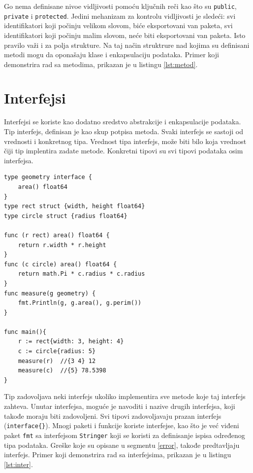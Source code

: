 \documentclass[12pt,oneside]{memoir}
\begin{document}
Go nema definisane nivoe vidljivosti  pomoću ključnih reči kao što su \texttt{public}, \texttt{private} i \texttt{protected}. Jedini mehanizam za kontrolu vidljivosti je sledeći: svi identifikatori koji počinju velikom slovom, biće eksportovani van paketa, svi identifikatori koji počinju malim slovom, neće biti eksportovani van paketa\cite{bookGoProg}. Isto pravilo važi i za polja strukture. Na taj način struktrure nad kojima su definisani metodi mogu da oponašaju klase i enkapsulaciju podataka. Primer koji demonstrira rad sa metodima, prikazan je u listingu \ref{lst:metod}.

\section{Interfejsi}

Interfejsi se koriste kao dodatno sredstvo abstrakcije i enkapsulacije podataka. Tip interfejs, definisan je kao skup potpisa metoda. Svaki interfejs se sastoji od vrednosti i konkretnog tipa. Vrednost tipa interfejs, može biti bilo koja vrednost čiji tip implentira zadate metode. Konkretni tipovi su svi tipovi podataka osim interfejsa.

\begin{center}
\begin{lstlisting}[caption=Primer koji demonstrira rad sa interfejsima, label={lst:inter},  backgroundcolor=\color{background}]
type geometry interface { 
	area() float64 
}
type rect struct {width, height float64}
type circle struct {radius float64}

func (r rect) area() float64 {
	return r.width * r.height
}
func (c circle) area() float64 {
	return math.Pi * c.radius * c.radius
}
func measure(g geometry) {
	fmt.Println(g, g.area(), g.perim())
}

func main(){
	r := rect{width: 3, height: 4}	
	c := circle{radius: 5}			
	measure(r)	//{3 4} 12 
  	measure(c)	//{5} 78.5398 
}
\end{lstlisting}
\end{center}

Tip zadovoljava neki interfejs ukoliko implementira sve metode koje taj interfejs zahteva. Unutar interfejsa, moguće je navoditi i nazive drugih interfejsa, koji takođe moraju biti zadovoljeni. Svi tipovi zadovoljavaju prazan interfejs (\texttt{interface\{\}}). Mnogi paketi i funkcije koriste interfejse, kao što je već viđeni paket \texttt{fmt} sa interfejsom \texttt{Stringer} koji se koristi za definisanje ispisa određenog tipa podataka. Greške koje su opisane u segmentu \ref{error}, takođe predtavljaju interfejs. Primer koji demonstrira rad sa interfejsima, prikazan je u listingu \ref{lst:inter}.
\end{document}

